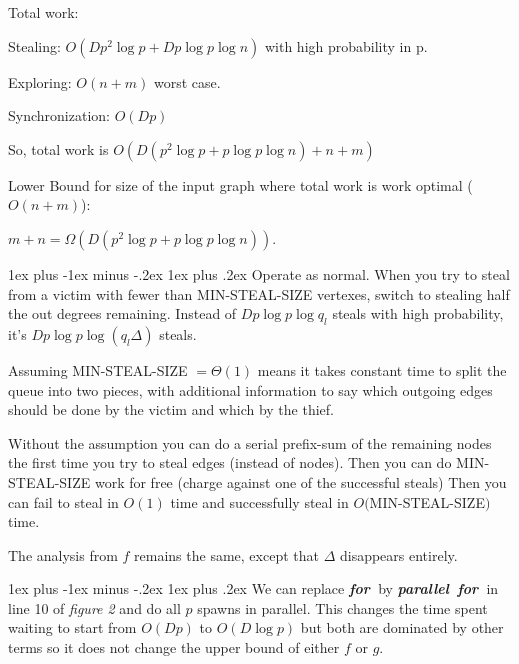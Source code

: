 \documentclass[11pt]{article}
\makeatletter
\renewcommand{\subsection}{\@startsection{subsection}{2}{0mm}%
                                     {1ex plus -1ex minus -.2ex}%
                                     {1ex plus .2ex}%
                                     {\normalfont\large\bfseries}}%
\newcommand{\xfor}{{\bf{\em{for~}}}}
\newcommand{\xparallel}{{\bf{\em{parallel~}}}}
\makeatother
\begin{document}
Total work:

Stealing: $O(D p^2 \log p + Dp\log p \log n)$ with high probability in p.

Exploring: $O(n + m)$ worst case.

Synchronization: $O(D p)$

So, total work is $O( D(p^2 \log p + p\log p\log n) + n + m)$

Lower Bound for size of the input graph where total work is work optimal ($O(n+m)$):

$m+n = \Omega(D(p^2 \log p + p\log p\log n))$.



\subsection{}
Operate as normal.  When you try to steal from a victim with fewer than MIN-STEAL-SIZE vertexes,
switch to stealing half the out degrees remaining.  Instead of $D p\log p\log q_l$ steals with high probability,
it's $D p \log p \log (q_l\Delta)$ steals.

Assuming MIN-STEAL-SIZE $= \Theta(1)$ means it takes constant time to split the queue into two pieces,
with additional information to say which outgoing edges should be done by the victim and which by the thief.

Without the assumption you can do a serial prefix-sum of the remaining nodes the first time you try to steal
edges (instead of nodes).  Then you can do MIN-STEAL-SIZE work for free (charge against one of the successful steals)
Then you can fail to steal in $O(1)$ time and successfully steal in $O($MIN-STEAL-SIZE$)$ time.

The analysis from $f$ remains the same, except that $\Delta$ disappears entirely.

\subsection{}
We can replace \xfor by \xparallel \xfor in line 10 of {\it figure 2} and do all $p$ spawns in parallel.
This changes the time spent waiting to start from $O(Dp)$ to $O(D\log p)$ but both are dominated by other terms
so it does not change the upper bound of either $f$ or $g$.
\end{document}
